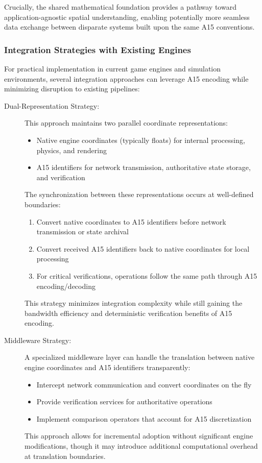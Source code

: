 \documentclass[10pt]{article}
\begin{document}
Crucially, the shared mathematical foundation provides a pathway toward application-agnostic spatial understanding, enabling potentially more seamless data exchange between disparate systems built upon the same A15 conventions.

\subsubsection{Integration Strategies with Existing Engines}\label{subsubsec-apps-integration}
For practical implementation in current game engines and simulation environments, several integration approaches can leverage A15 encoding while minimizing disruption to existing pipelines:

\begin{description}
    \item[Dual-Representation Strategy:] This approach maintains two parallel coordinate representations:
        \begin{itemize} \itemsep0pt
            \item Native engine coordinates (typically floats) for internal processing, physics, and rendering
            \item A15 identifiers for network transmission, authoritative state storage, and verification
        \end{itemize}
        The synchronization between these representations occurs at well-defined boundaries:
        \begin{enumerate} \itemsep0pt
            \item Convert native coordinates to A15 identifiers before network transmission or state archival
            \item Convert received A15 identifiers back to native coordinates for local processing
            \item For critical verifications, operations follow the same path through A15 encoding/decoding
        \end{enumerate}
        This strategy minimizes integration complexity while still gaining the bandwidth efficiency and deterministic verification benefits of A15 encoding.

    \item[Middleware Strategy:] A specialized middleware layer can handle the translation between native engine coordinates and A15 identifiers transparently:
        \begin{itemize} \itemsep0pt
            \item Intercept network communication and convert coordinates on the fly
            \item Provide verification services for authoritative operations
            \item Implement comparison operators that account for A15 discretization
        \end{itemize}
        This approach allows for incremental adoption without significant engine modifications, though it may introduce additional computational overhead at translation boundaries.


\end{description}
\end{document}
